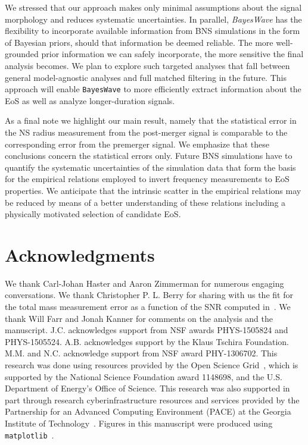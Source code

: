\documentclass[aps,prd,amsmath,floats,floatfix, twocolumn,
superscriptaddress,nofootinbib,showpacs]{revtex4-1}
\begin{document}
We stressed that our approach makes only minimal assumptions about the signal morphology and reduces systematic uncertainties. In parallel, \textit{BayesWave} has the flexibility to incorporate available information from BNS simulations in the form of Bayesian priors, should that information be deemed reliable. The more well-grounded prior information we can safely incorporate, the more sensitive the final analysis becomes. We plan to explore such targeted analyses that fall between general model-agnostic analyses and full matched filtering in the future. This approach will enable {\tt BayesWave} to more efficiently extract information about the EoS as well as analyze longer-duration signals.

As a final note we highlight our main result, namely that the statistical error in the NS radius measurement from the post-merger signal is comparable to the corresponding error from the premerger signal. We emphasize that these conclusions concern the statistical errors only. Future BNS simulations have to quantify the systematic uncertainties of the simulation data that form the basis for the empirical relations employed to invert frequency measurements to EoS properties. We anticipate that the intrinsic scatter in the empirical relations may be reduced by means of a better understanding of these relations including a physically motivated selection of candidate EoS.

\section{Acknowledgments}

We thank Carl-Johan Haster and Aaron Zimmerman for numerous engaging conversations. We thank Christopher P. L. Berry for sharing with us the fit for the total mass measurement error as a function of the SNR computed in~\cite{Farr:2015lna}. We thank Will Farr and Jonah Kanner for comments on the analysis and the manuscript. J.C. acknowledges support from NSF awards PHYS-1505824 and PHYS-1505524. A.B. acknowledges support by the Klaus Tschira Foundation.   M.M. and N.C. acknowledge support from NSF award PHY-1306702. This research was done using resources provided by the Open Science Grid~\cite{pordes:2007,Sfiligoi:2009}, which is supported by the National Science Foundation award 1148698, and the U.S. Department of Energy's Office of Science.  This research was also supported in part through research cyberinfrastructure resources and services provided by the Partnership for an Advanced Computing Environment (PACE) at the Georgia Institute of Technology~\cite{PACE}. Figures in this manuscript were produced using {\tt matplotlib}~\cite{Hunter:2007}.



\end{document}
